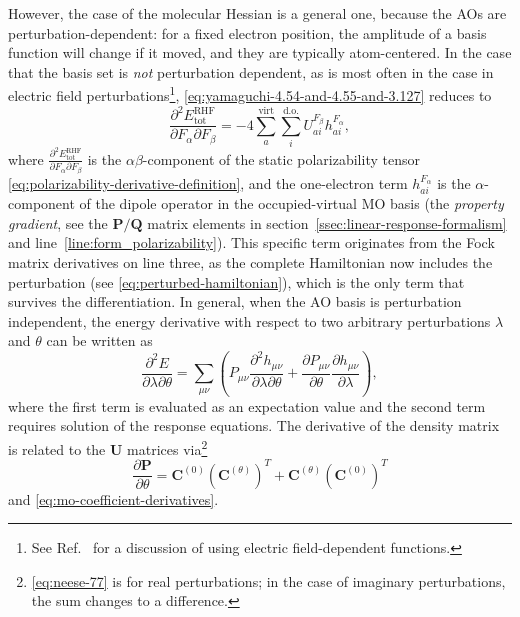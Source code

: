\documentclass[%
class = book,%
crop = false,%
float = true,%
multi = true,%
preview = false,%
]{standalone}
\begin{document}
However, the case of the molecular Hessian is a general one, because the AOs are perturbation-dependent: for a fixed electron position, the amplitude of a basis function will change if it moved, and they are typically atom-centered. In the case that the basis set is \textit{not} perturbation dependent, as is most often in the case in electric field perturbations\footnote{See Ref.~\parencite{doi:10.1021/j100074a008} for a discussion of using electric field-dependent functions.}, \eqref{eq:yamaguchi-4.54-and-4.55-and-3.127} reduces to
\begin{equation}
  \label{eq:yamaguchi-17.54} \tag{Yamaguchi eq. 17.54}
  \frac{\partial^{2} E_{\text{tot}}^{\text{RHF}}}{\partial F_{\alpha} \partial F_{\beta}} = -4 \sum_{a}^{\text{virt}} \sum_{i}^{\text{d.o.}} U_{ai}^{F_{\beta}} h_{ai}^{F_{\alpha}},
\end{equation}
where \(\frac{\partial^{2} E_{\text{tot}}^{\text{RHF}}}{\partial F_{\alpha} \partial F_{\beta}}\) is the \(\alpha\beta\)-component of the static polarizability tensor \eqref{eq:polarizability-derivative-definition}, and the one-electron term \(h_{ai}^{F_{\alpha}}\) is the \(\alpha\)-component of the dipole operator in the occupied-virtual MO basis (the \emph{property gradient}, see the \(\mathbf{P}/\mathbf{Q}\) matrix elements in section~\ref{ssec:linear-response-formalism} and line~\ref{line:form_polarizability}). This specific term originates from the Fock matrix derivatives on line three, as the complete Hamiltonian now includes the perturbation (see \eqref{eq:perturbed-hamiltonian}), which is the only term that survives the differentiation. In general, when the AO basis is perturbation independent, the energy derivative with respect to two arbitrary perturbations \(\lambda\) and \(\theta\) can be written as\cite{NEESE2009526}
\begin{equation}
  \label{eq:neese-77} \tag{Neese eq. 77}
  \frac{\partial^{2} E}{\partial \lambda \partial \theta} = \sum_{\mu\nu} \left( P_{\mu\nu} \frac{\partial^{2} h_{\mu\nu}}{\partial \lambda \partial \theta} + \frac{\partial P_{\mu\nu}}{\partial \theta} \frac{\partial h_{\mu\nu}}{\partial \lambda} \right),
\end{equation}
where the first term is evaluated as an expectation value and the second term requires solution of the response equations. The derivative of the density matrix is related to the \(\mathbf{U}\) matrices via\footnote{\eqref{eq:neese-77} is for real perturbations; in the case of imaginary perturbations, the sum changes to a difference.}
\begin{equation}
  \frac{\partial \mathbf{P}}{\partial \theta} = \mathbf{C}^{(0)} \left( \mathbf{C}^{(\theta)} \right)^{T} + \mathbf{C}^{(\theta)} \left( \mathbf{C}^{(0)} \right)^{T}
\end{equation}
and \eqref{eq:mo-coefficient-derivatives}.
\end{document}
